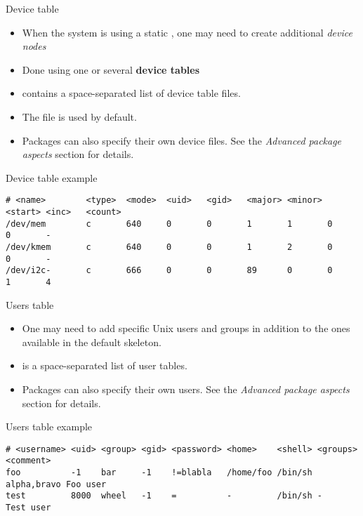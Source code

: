 \begin{frame}[fragile]{Device table}

  \begin{itemize}
  \item When the system is using a static , one may need to
    create additional {\em device nodes}
  \item Done using one or several {\bf device tables}
  \item {} contains a
    space-separated list of device table files.
  \item The  file is used by
    default.
  \item Packages can also specify their own device files. See the {\em
      Advanced package aspects} section for details.
  \end{itemize}

\begin{block}{Device table example}
{\tiny
\begin{verbatim}
# <name>        <type>  <mode>  <uid>   <gid>   <major> <minor> <start> <inc>   <count>
/dev/mem        c       640     0       0       1       1       0       0       -
/dev/kmem       c       640     0       0       1       2       0       0       -
/dev/i2c-       c       666     0       0       89      0       0       1       4
\end{verbatim}
}
\end{block}

\end{frame}

\begin{frame}[fragile]{Users table}
  \begin{itemize}
  \item One may need to add specific Unix users and groups in addition
    to the ones available in the default skeleton.
  \item {} is a space-separated list of
    user tables.
  \item Packages can also specify their own users. See the {\em
      Advanced package aspects} section for details.
  \end{itemize}

\begin{block}{Users table example}
{\tiny
\begin{verbatim}
# <username> <uid> <group> <gid> <password> <home>    <shell> <groups>    <comment>
foo          -1    bar     -1    !=blabla   /home/foo /bin/sh alpha,bravo Foo user
test         8000  wheel   -1    =          -         /bin/sh -           Test user
\end{verbatim}
}
\end{block}

\end{frame}


